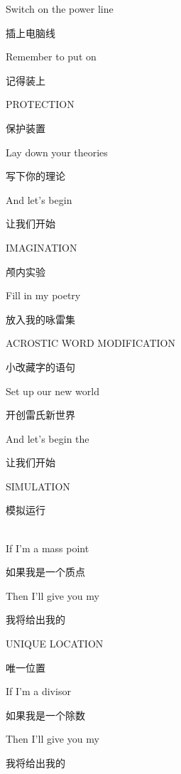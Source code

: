 \documentclass[UTF8,12pt,oneside]{ctexbook}
\begin{document}
        \begin{center}

            Switch on the power line

            插上电脑线

            Remember to put on

            记得装上

            PROTECTION

            保护装置

            Lay down your theories
            
            写下你的理论
            
            And let’s begin
            
            让我们开始
            
            IMAGINATION
            
            颅内实验
            
            Fill in my poetry
            
            放入我的咏雷集
            
            ACROSTIC WORD MODIFICATION
            
            小改藏字的语句
            
            Set up our new world
            
            开创雷氏新世界
            
            And let’s begin the
            
            让我们开始
            
            SIMULATION
            
            模拟运行

            ~\\
            If I’m a mass point
            
            如果我是一个质点
            
            Then I’ll give you my
            
            我将给出我的
            
            UNIQUE LOCATION
            
            唯一位置
            
            If I’m a divisor
            
            如果我是一个除数
            
            Then I’ll give you my
            
            我将给出我的
            

\end{center}
\end{document}
